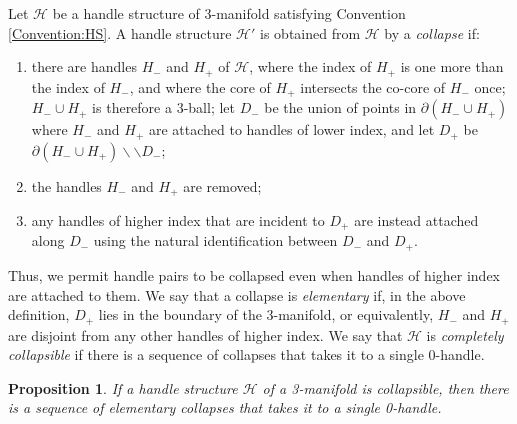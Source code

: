 \documentclass[oneside]{amsart}
\numberwithin{equation}{section}
\theoremstyle{plain}
\newtheorem{proposition}[equation]{Proposition}
\theoremstyle{definition}
\newcommand{\cut}{\backslash\backslash}
\newcommand{\calH}{\mathcal{H}}
\begin{document}
Let $\calH$ be a handle structure of 3-manifold satisfying Convention \ref{Convention:HS}.
A handle structure $\calH'$ is obtained from $\calH$ by a \emph{collapse} if:
\begin{enumerate}
\item there are handles
$H_-$ and $H_+$ of $\calH$, where the index of $H_+$ is one more than the index of $H_-$,
and where the core of $H_+$ intersects the co-core of $H_-$ once; $H_- \cup H_+$ is therefore a 3-ball; 
let $D_-$ be the union of points in $\partial (H_- \cup H_+)$ where $H_-$ and $H_+$
are attached to handles of lower index, and let $D_+$ be $\partial (H_- \cup H_+) \cut D_-$;
\item the handles $H_-$ and $H_+$ are removed;
\item any handles of higher index that are incident to $D_+$ are instead
attached along $D_-$ using the natural identification between $D_-$ and $D_+$.
\end{enumerate}
Thus, we permit handle pairs to be collapsed even when handles of higher index are
attached to them. We say that a collapse is \emph{elementary} if, in the above definition,
$D_+$ lies in the boundary of the 3-manifold, or equivalently, $H_-$ and $H_+$ are
disjoint from any other handles of higher index.
We say that $\calH$ is \emph{completely collapsible} if there is a sequence of collapses that takes
it to a single 0-handle.

\begin{proposition} 
\label{Prop:ElementaryCollapses}
If a handle structure $\calH$ of a 3-manifold is collapsible, then there is a sequence of elementary collapses that
takes it to a single 0-handle.
\end{proposition}
\end{document}
